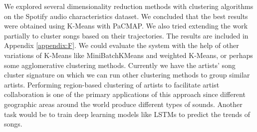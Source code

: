We explored several dimensionality reduction methods with clustering algorithms on the Spotify audio characteristics dataset. We concluded that the best results were obtained using K-Means with PaCMAP. We also tried extending the work partially to cluster songs based on their trajectories. The results are included in Appendix \ref{appendix:F}. We could evaluate the system with the help of other variations of K-Means like MiniBatchKMeans and weighted K-Means, or perhaps some agglomerative clustering methods. Currently we have the artists' song cluster signature on which we can run other clustering methods to group similar artists. Performing region-based clustering of artists to facilitate artist collaboration is one of the primary applications of this approach since different geographic areas around the world produce different types of sounds. Another task would be to train deep learning models like LSTMs to predict the trends of songs. 

